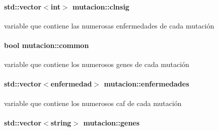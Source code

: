\paragraph[{\texorpdfstring{clnsig}{clnsig}}]{\setlength{\rightskip}{0pt plus 5cm}std\+::vector$<$int$>$ mutacion\+::clnsig\hspace{0.3cm}{\ttfamily [private]}}\hypertarget{classmutacion_a0d029eee6925649df15081b780c12e37}{}\label{classmutacion_a0d029eee6925649df15081b780c12e37}


variable que contiene las numerosas enfermedades de cada mutación 

\paragraph[{\texorpdfstring{common}{common}}]{\setlength{\rightskip}{0pt plus 5cm}bool mutacion\+::common\hspace{0.3cm}{\ttfamily [private]}}\hypertarget{classmutacion_a6dabfef6167d64030f095887b15f65dd}{}\label{classmutacion_a6dabfef6167d64030f095887b15f65dd}


variable que contiene los numerosos genes de cada mutación 

\paragraph[{\texorpdfstring{enfermedades}{enfermedades}}]{\setlength{\rightskip}{0pt plus 5cm}std\+::vector$<${\bf enfermedad}$>$ mutacion\+::enfermedades\hspace{0.3cm}{\ttfamily [private]}}\hypertarget{classmutacion_ac8cca92dea1ab6fb9c193eed55a5ad28}{}\label{classmutacion_ac8cca92dea1ab6fb9c193eed55a5ad28}


variable que contiene los numerosos caf de cada mutación 

\paragraph[{\texorpdfstring{genes}{genes}}]{\setlength{\rightskip}{0pt plus 5cm}std\+::vector$<$string$>$ mutacion\+::genes\hspace{0.3cm}{\ttfamily [private]}}\hypertarget{classmutacion_af0048945b6062d6eb88b91db707993f6}{}\label{classmutacion_af0048945b6062d6eb88b91db707993f6}


